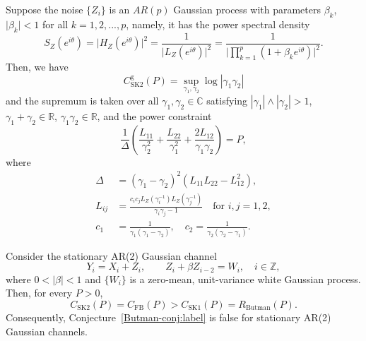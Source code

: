\documentclass[10pt,a4paper]{amsart}
\begin{document}
\begin{thm}\label{main-theorem-sk2}
Suppose the noise $\{ Z_i \}$ is an $AR(p)$ Gaussian process with parameters $\beta_k$, $\vert \beta_k\vert<1$ for all $k=1,2,...,p$, namely, it has the power spectral density
\begin{equation*}
S_Z(e^{i\theta}) = \vert H_Z(e^{i\theta}) \vert^2 = \frac{1}{\vert L_Z(e^{i\theta}) \vert^2} = \frac{1}{\vert\prod_{k=1}^{p}(1+\beta_ke^{i\theta})\vert^2}.
\end{equation*}
Then, we have
\begin{equation}\label{I-SK2-thm}
C^\mathrm{g}_{\mathrm{SK2}}(P) =\sup_{\gamma_1,\gamma_2} \log  |\gamma_1\gamma_2|
\end{equation}
and the supremum is taken over all $\gamma_1,\gamma_2\in\mathbb{C}$ satisfying $|\gamma_1|\wedge|\gamma_2|>1$, $\gamma_1+\gamma_2\in \mathbb{R}$, $\gamma_1\gamma_2\in\mathbb{R}$, and the power constraint 
\begin{equation}\label{power-eqn-sk2-thm}
\frac{1}{\Delta}\left( \frac{L_{11}}{\gamma^2_2}+\frac{L_{22}}{\gamma_1^2} +\frac{2L_{12}}{\gamma_1\gamma_2}  \right)= P,
\end{equation}
where 
\begin{equation}\label{main-thm-notations}
\begin{aligned}
\Delta &= (\gamma_1-\gamma_2)^2(L_{11}L_{22}-L_{12}^2),\\
L_{ij} &=\frac{c_{i}c_{j}L_Z(\gamma_i^{-1})L_Z(\gamma_j^{-1})}{\gamma_i\gamma_j-1} \quad \mbox{for $i,j=1,2,$}\\
c_1 &= \frac{1}{\gamma_1(\gamma_1-\gamma_2)}, \quad c_2 = \frac{1}{\gamma_2(\gamma_2-\gamma_1)}.
\end{aligned}
\end{equation}
\end{thm}

\begin{pr}
\label{prop:interleaved-AR1}
Consider the stationary AR(2) Gaussian channel
$$
Y_i=X_i+Z_i,\qquad Z_i+\beta Z_{i-2}=W_i,\quad i\in\mathbb Z,
$$
where \(0<|\beta|<1\) and \(\{W_i\}\) is a zero-mean, unit-variance white Gaussian process. Then, for every $P>0$,
$$
C_{\mathrm{SK2}}(P) = C_{\mathrm{FB}}(P) > C_{\mathrm{SK1}}(P) = R_{\mathrm{Butman}}(P).
$$
Consequently, Conjecture~\ref{Butman-conj:label} is false for stationary AR(2) Gaussian channels.
\end{pr}
\end{document}
